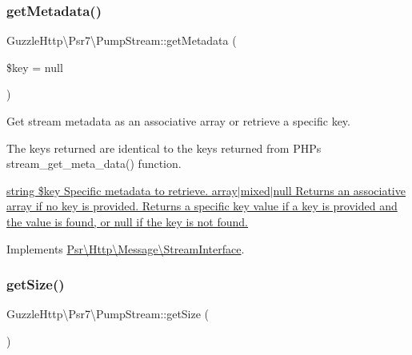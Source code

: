 \mbox{\label{classGuzzleHttp_1_1Psr7_1_1PumpStream_a2b6f8daa65b2bc0a78f4950dfcb97d48}} 
\subsubsection{\texorpdfstring{get\+Metadata()}{getMetadata()}}
{\footnotesize\ttfamily Guzzle\+Http\textbackslash{}\+Psr7\textbackslash{}\+Pump\+Stream\+::get\+Metadata (\begin{DoxyParamCaption}\item[{}]{\$key = {\ttfamily null} }\end{DoxyParamCaption})}

Get stream metadata as an associative array or retrieve a specific key.

The keys returned are identical to the keys returned from P\+HP\textquotesingle{}s stream\+\_\+get\+\_\+meta\+\_\+data() function.

\hyperlink{}{string \$key Specific metadata to retrieve.  array$\vert$mixed$\vert$null Returns an associative array if no key is provided. Returns a specific key value if a key is provided and the value is found, or null if the key is not found. }

Implements \hyperlink{interfacePsr_1_1Http_1_1Message_1_1StreamInterface_ac5e77fbbc7ba4235a4041d966f3aaa84}{Psr\textbackslash{}\+Http\textbackslash{}\+Message\textbackslash{}\+Stream\+Interface}.

\mbox{\label{classGuzzleHttp_1_1Psr7_1_1PumpStream_a592871e85dd572d1ef3f95f6a27948e2}} 
\subsubsection{\texorpdfstring{get\+Size()}{getSize()}}
{\footnotesize\ttfamily Guzzle\+Http\textbackslash{}\+Psr7\textbackslash{}\+Pump\+Stream\+::get\+Size (\begin{DoxyParamCaption}{ }\end{DoxyParamCaption})}

